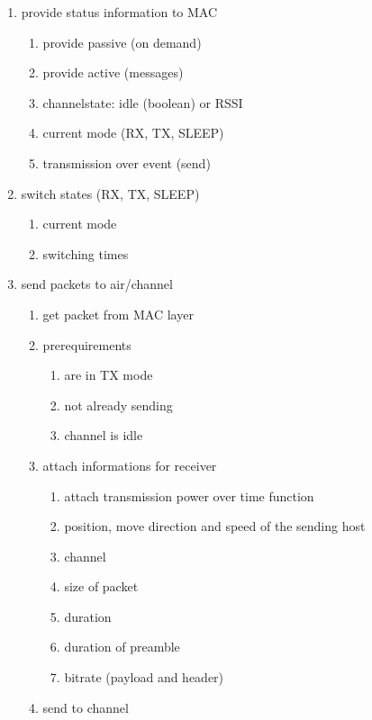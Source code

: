 \begin{enumerate}
 \item provide status information to MAC
	\begin{enumerate}
	\item provide passive (on demand) \label{provpassive}
	\item provide active (messages) \label{provactive}
	\item channelstate: idle (boolean) or RSSI \label{channelstate}
	\item current mode (RX, TX, SLEEP) \label{currentmode}
	\item transmission over event (send) \label{txover}
	\end{enumerate}
 \item switch states (RX, TX, SLEEP)
	\begin{enumerate}
	\item current mode \label{switchmode}
	\item switching times \label{switchtimes}
	\end{enumerate}
 \item send packets to air/channel
	\begin{enumerate}
	\item get packet from MAC layer\label{packetFromMac}
	\item prerequirements
		\begin{enumerate}
		\item are in TX mode \label{sendPreqMode}
		\item not already sending \label{sendPreqSending}
		\item channel is idle \label{sendPreqIdle}		
		\end{enumerate}
	\item attach informations for receiver
		\begin{enumerate}
		\item attach transmission power over time function \label{sendInfoTXPower}
		\item position, move direction and speed of the sending host \label{sendInfoMove}
		\item channel \label{sendInfoChannel}
		\item size of packet \label{sendInfoSize}
		\item duration\label{sendInfoDuration}
		\item duration of preamble \label{sendInfoPreambleDuration}
		\item bitrate (payload and header)	\label{sendInfoBitrate}
		\end{enumerate}	
	\item send to channel \label{sendToChannel}
	

\end{enumerate}
\end{enumerate}
